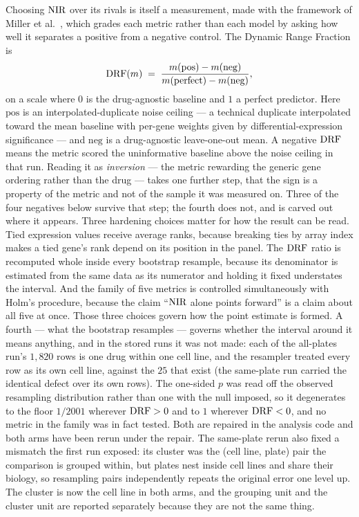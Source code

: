 Choosing $\textrm{NIR}$ over its rivals is itself a measurement, made with the framework of Miller
et al.~\cite{miller}, which grades each metric rather than each model by asking how well it
separates a positive from a negative control. The Dynamic Range Fraction is
\begin{equation}
 \textrm{DRF}(m) \;=\; \frac{m(\textrm{pos}) - m(\textrm{neg})}{m(\textrm{perfect}) - m(\textrm{neg})},
\end{equation}
on a scale where $0$ is the drug-agnostic baseline and $1$ a perfect predictor. Here
$\textrm{pos}$ is an interpolated-duplicate noise ceiling --- a technical duplicate interpolated
toward the mean baseline with per-gene weights given by differential-expression significance ---
and $\textrm{neg}$ is a drug-agnostic leave-one-out mean. A negative $\textrm{DRF}$ means the metric scored
the uninformative baseline above the noise ceiling in that run. Reading it as \emph{inversion} ---
the metric rewarding the generic gene ordering rather than the drug --- takes one further step,
that the sign is a property of the metric and not of the sample it was measured on. Three of the
four negatives below survive that step; the fourth does not, and is carved out where it appears. Three hardening choices matter for how the result can be read. Tied
expression values receive average ranks, because breaking ties by array index makes a tied gene's
rank depend on its position in the panel. The $\textrm{DRF}$ ratio is recomputed whole inside every
bootstrap resample, because its denominator is estimated from the same data as its numerator and
holding it fixed understates the interval. And the family of five metrics is controlled
simultaneously with Holm's procedure, because the claim ``$\textrm{NIR}$ alone points forward'' is a claim
about all five at once. Those three choices govern how the point estimate is formed. A fourth ---
what the bootstrap resamples --- governs whether the interval around it means anything, and in the
stored runs it was not made: each of the all-plates run's $1{,}820$ rows is one drug within one
cell line, and the resampler treated every row as its own cell line, against the $25$ that exist
(the same-plate run carried the identical defect over its own rows). The one-sided $p$ was read
off the observed resampling distribution rather than one with the null imposed, so it degenerates
to the floor $1/2001$ wherever $\textrm{DRF} > 0$ and to $1$ wherever $\textrm{DRF} < 0$, and no metric in the
family was in fact tested. Both are repaired in the analysis code and both arms have been rerun
under the repair. The same-plate rerun also fixed a mismatch the first run exposed: its cluster was
the (cell line, plate) pair the comparison is grouped within, but plates nest inside cell lines and
share their biology, so resampling pairs independently repeats the original error one level up. The
cluster is now the cell line in both arms, and the grouping unit and the cluster unit are reported
separately because they are not the same thing.

